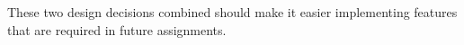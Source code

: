 \documentclass{sig-alternate}
\begin{document}
These two design decisions combined should make it easier implementing
features that are required in future assignments.

%

\end{document}
